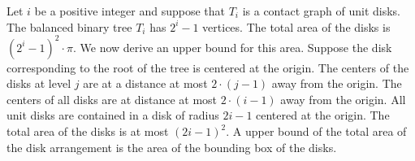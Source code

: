 \documentclass[10pt]{CSUNthesis}
\theoremstyle{plain}%
\theoremstyle{definition}
\theoremstyle{remark}
\begin{document}
Let $i$ be a positive integer and suppose that $T_i$ is a contact graph of unit disks.
The balanced binary tree $T_i$ has $2^i -1$ vertices.
The total area of the disks is $\left( 2^i -1 \right)^2 \cdot \pi$.
We now derive an upper bound for this area.
Suppose the disk corresponding to the root of the tree is centered at the origin.
The centers of the disks at level $j$ are at a distance at most $2\cdot (j-1)$ away from the origin.
The centers of all disks are at distance at most $2 \cdot (i -1)$ away from the origin.
All unit disks are contained in a disk of radius $2i-1$ centered at the origin.
The total area of the disks is at most $(2i-1)^2$.
A upper bound of the total area of the disk arrangement is the area of the bounding box of the disks.
\end{document}
